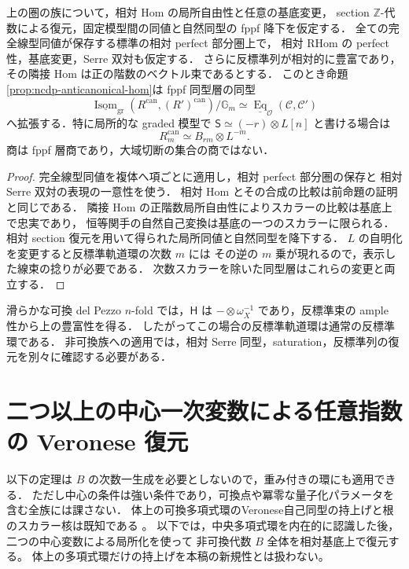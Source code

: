 \begin{proposition}[相対版と基底線束]
\label{prop:ncdp-relative-anticanonical-hom}
上の圏の族について，相対 Hom の局所自由性と任意の基底変更，
section $\mathbb Z$-代数による復元，固定模型間の同値と自然同型の fppf 降下を仮定する．
全ての完全線型同値が保存する標準の相対 perfect 部分圏上で，
相対 RHom の perfect 性，基底変更，Serre 双対も仮定する．
さらに反標準列が相対的に豊富であり，その隣接 Hom は正の階数のベクトル束であるとする．
このとき命題\ref{prop:ncdp-anticanonical-hom}は fppf 同型層の同型
\[
 \underline{\operatorname{Isom}}_{\mathrm{gr}}(R^{\mathrm{can}},(R')^{\mathrm{can}})
       /\mathbb G_m
 \simeq
 \underline{\operatorname{Eq}}_{\mathcal O}(\mathcal C,\mathcal C')
\]
へ拡張する．特に局所的な graded 模型で
$\mathsf S\simeq(-r)\otimes L[n]$ と書ける場合は
\[
 R^{\mathrm{can}}_m\simeq B_{rm}\otimes L^{-m}.
\]
商は fppf 層商であり，大域切断の集合の商ではない．
\end{proposition}
\begin{proof}
完全線型同値を複体へ項ごとに適用し，相対 perfect 部分圏の保存と
相対 Serre 双対の表現の一意性を使う．
相対 Hom とその合成の比較は前命題の証明と同じである．
隣接 Hom の正階数局所自由性によりスカラーの比較は基底上で忠実であり，
恒等関手の自然自己変換は基底の一つのスカラーに限られる．
相対 section 復元を用いて得られた局所同値と自然同型を降下する．
$L$ の自明化を変更すると反標準軌道環の次数 $m$ には
その逆の $m$ 乗が現れるので，表示した線束の捻りが必要である．
次数スカラーを除いた同型層はこれらの変更と両立する．
\end{proof}

滑らかな可換 del Pezzo $n$-fold では，$\mathsf H$ は
$-\otimes\omega_X^{-1}$ であり，反標準束の ample 性から上の豊富性を得る．
したがってこの場合の反標準軌道環は通常の反標準環である．
非可換族への適用では，相対 Serre 同型，saturation，反標準列の復元を別々に確認する必要がある．

\section{二つ以上の中心一次変数による任意指数の Veronese 復元}
\label{sec:ncdp-veronese-recovery}

以下の定理は $B$ の次数一生成を必要としないので，重み付きの環にも適用できる．
ただし中心の条件は強い条件であり，可換点や冪零な量子化パラメータを含む全族には課さない．
体上の可換多項式環のVeronese自己同型の持上げと根のスカラー核は既知である
\cite[Corollaries~4--5]{AMU2025}。
以下では，中央多項式環を内在的に認識した後，二つの中心変数による局所化を使って
非可換代数 $B$ 全体を相対基底上で復元する。
体上の多項式環だけの持上げを本稿の新規性とは扱わない。


